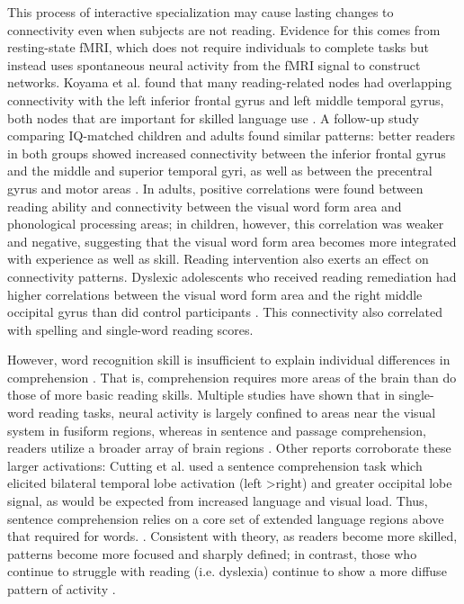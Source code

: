 This process of interactive specialization may cause lasting changes to connectivity even when subjects are not reading. Evidence for this comes from resting-state fMRI, which does not require individuals to complete tasks but instead uses spontaneous neural activity from the fMRI signal to construct networks. Koyama et al. found that many reading-related nodes had overlapping connectivity with the left inferior frontal gyrus and left middle temporal gyrus, both nodes that are important for skilled language use \cite{Koyama2010}. A follow-up study comparing IQ-matched children and adults found similar patterns: better readers in both groups showed increased connectivity between the inferior frontal gyrus and the middle and superior temporal gyri, as well as between the precentral gyrus and motor areas \cite{Koyama2011}. In adults, positive correlations were found between reading ability and connectivity between the visual word form area and phonological processing areas; in children, however, this correlation was weaker and negative, suggesting that the visual word form area becomes more integrated with experience as well as skill. Reading intervention also exerts an effect on connectivity patterns. Dyslexic adolescents who received reading remediation had higher correlations between the visual word form area and the right middle occipital gyrus than did control participants \cite{Koyama2013}. This connectivity also correlated with spelling and single-word reading scores.

However, word recognition skill is insufficient to explain individual differences in comprehension \cite{Gough1986, Hoover1990}. That is, comprehension requires more areas of the brain than do those of more basic reading skills. Multiple studies have shown that in single-word reading tasks, neural activity is largely confined to areas near the visual system in fusiform regions, whereas in sentence and passage comprehension, readers utilize a broader array of brain regions \cite{Rimrodt2008,Xu2005}. Other reports corroborate these larger activations: Cutting et al. used a sentence comprehension task which elicited bilateral temporal lobe activation (left \textgreater right) and greater occipital lobe signal, as would be expected from increased language and visual load. Thus, sentence comprehension relies on a core set of extended language regions above that required for words.  \cite{Cutting2006a}. Consistent with theory, as readers become more skilled, patterns become more focused and sharply defined; in contrast, those who continue to struggle with reading (i.e. dyslexia) continue to show a more diffuse pattern of activity \cite{Rimrodt2009}. 

